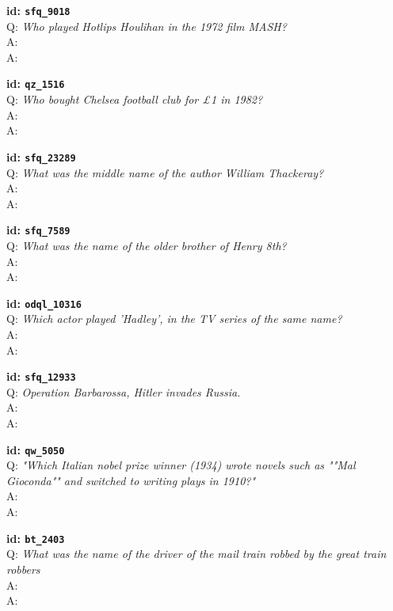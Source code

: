 \tiny{\setlength{\parindent}{0cm}
\textbf{id: \texttt{sfq\_9018}} \\
Q: \textit{Who played Hotlips Houlihan in the 1972 film MASH?} \\
A:  \\
A: }

\tiny{\setlength{\parindent}{0cm}
\textbf{id: \texttt{qz\_1516}} \\
Q: \textit{Who bought Chelsea football club for £1 in 1982?} \\
A:  \\
A: }

\tiny{\setlength{\parindent}{0cm}
\textbf{id: \texttt{sfq\_23289}} \\
Q: \textit{What was the middle name of the author William Thackeray?} \\
A:  \\
A: }

\tiny{\setlength{\parindent}{0cm}
\textbf{id: \texttt{sfq\_7589}} \\
Q: \textit{What was the name of the older brother of Henry 8th?} \\
A:  \\
A: }

\tiny{\setlength{\parindent}{0cm}
\textbf{id: \texttt{odql\_10316}} \\
Q: \textit{Which actor played 'Hadley', in the TV series of the same name?} \\
A:  \\
A: }

\tiny{\setlength{\parindent}{0cm}
\textbf{id: \texttt{sfq\_12933}} \\
Q: \textit{Operation Barbarossa, Hitler invades Russia.} \\
A:  \\
A: }

\tiny{\setlength{\parindent}{0cm}
\textbf{id: \texttt{qw\_5050}} \\
Q: \textit{"Which Italian nobel prize winner (1934) wrote novels such as ""Mal Gioconda"" and switched to writing plays in 1910?"} \\
A:  \\
A: }

\tiny{\setlength{\parindent}{0cm}
\textbf{id: \texttt{bt\_2403}} \\
Q: \textit{What was the name of the driver of the mail train robbed by the great train robbers} \\
A:  \\
A: }


